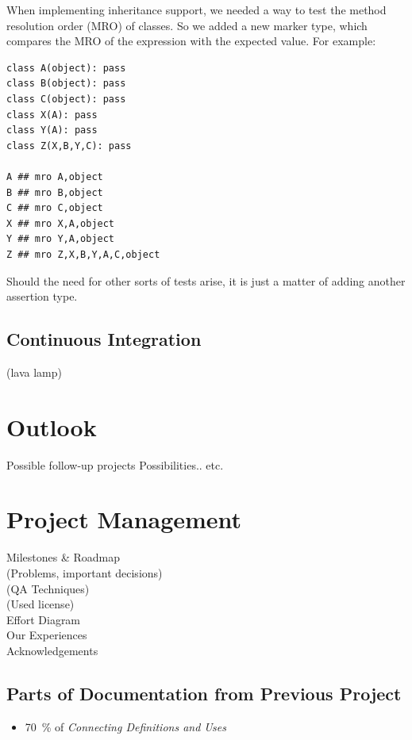 \documentclass[12pt,halfparskip,DIV11,BCOR10mm]{scrreprt}
\begin{document}
When implementing inheritance support, we needed a way to test the method resolution order (MRO) of classes. So we added a new marker type,  which compares the MRO of the expression with the expected value. For example:

\begin{lstlisting}
class A(object): pass
class B(object): pass
class C(object): pass
class X(A): pass
class Y(A): pass
class Z(X,B,Y,C): pass

A ## mro A,object
B ## mro B,object
C ## mro C,object
X ## mro X,A,object
Y ## mro Y,A,object
Z ## mro Z,X,B,Y,A,C,object
\end{lstlisting}

Should the need for other sorts of tests arise, it is just a matter of adding another assertion type.

\section{Continuous Integration}

  (lava lamp)


\chapter{Outlook}
 Possible follow-up projects
 Possibilities.. etc.

\chapter{Project Management}
 Milestones \& Roadmap \\
 (Problems, important decisions) \\
 (QA Techniques) \\
 (Used license) \\
 Effort Diagram \\
 Our Experiences \\
 Acknowledgements 



\section{Parts of Documentation from Previous Project}

\begin{itemize}
	\item 70~\% of \emph{Connecting Definitions and Uses} %
\end{itemize}
\end{document}
